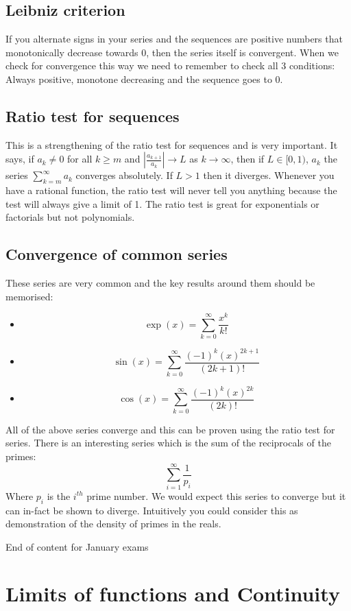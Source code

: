 \documentclass[12pt]{article}
\begin{document}
\subsection*{Leibniz criterion}
If you alternate signs in your series and the sequences are positive numbers that monotonically decrease towards 0, then the series itself is convergent. When we check for convergence this way we need to remember to check all 3 conditions: Always positive, monotone decreasing and the sequence goes to 0.
\subsection*{Ratio test for sequences}
This is a strengthening of the ratio test for sequences and is very important. It says, if \(a_k\ne0\) for all \(k\geq m\) and \(\left|\frac{a_{k+1}}{a_k}\right|\to L\) as \(k\to\infty\), then if \(L\in[0,1)\), \(a_k\) the series \(\sum^\infty_{k=m}a_k\) converges absolutely. If \(L>1\) then it diverges. Whenever you have a rational function, the ratio test will never tell you anything because the test will always give a limit of 1. The ratio test is great for exponentials or factorials but not polynomials.
\subsection*{Convergence of common series}
These series are very common and the key results around them should be memorised:
\begin{itemize}
    \item 
    \[\exp(x)=\sum^\infty_{k=0}\frac{x^k}{k!}\]
    \item 
    \[\sin(x)=\sum^\infty_{k=0}\frac{(-1)^k(x)^{2k+1}}{(2k+1)!}\]
    \item 
    \[\cos(x)=\sum^\infty_{k=0}\frac{(-1)^k(x)^{2k}}{(2k)!}\]
\end{itemize}
All of the above series converge and this can be proven using the ratio test for series. There is an interesting series which is the sum of the reciprocals of the primes:
\[\sum^\infty_{i=1}\frac{1}{p_i}\]
Where \(p_i\) is the \(i^{th}\) prime number. We would expect this series to converge but it can in-fact be shown to diverge. Intuitively you could consider this as demonstration of the density of primes in the reals.

\hrulefill
\begin{center}
End of content for January exams
\end{center}
\hrulefill
\section{Limits of functions and Continuity}
\end{document}
